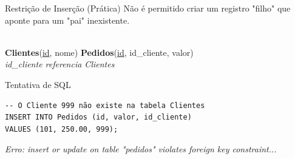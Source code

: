 \documentclass[9pt]{beamer}
\begin{document}
\begin{frame}[fragile]{Restrição de Inserção (Prática)}
  \small
  Não é permitido criar um registro "filho" que aponte para um "pai" inexistente.
  \vspace{0.3cm}
  \centering
  \\
  \centering\scriptsize
  \textbf{Clientes}(\underline{id}, nome) \quad \textbf{Pedidos}(\underline{id}, \color{red}id\_cliente\color{black}, valor) \\
  \textit{id\_cliente referencia Clientes}
  \vspace{0.2cm}
  \begin{exampleblock}{Tentativa de SQL}
\begin{lstlisting}
-- O Cliente 999 não existe na tabela Clientes
INSERT INTO Pedidos (id, valor, id_cliente)
VALUES (101, 250.00, 999);
\end{lstlisting}
    \vspace{0.1cm}
    \color{red}\textit{Erro: insert or update on table "pedidos" violates foreign key constraint...}
  \end{exampleblock}
\end{frame}
\end{document}
